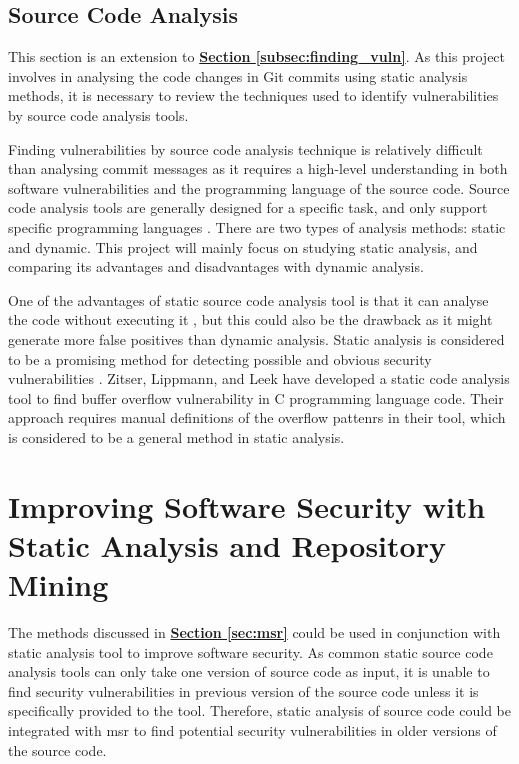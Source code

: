 \documentclass[12pt, a4paper]{report}
\begin{document}
\subsection{Source Code Analysis}
This section is an extension to \hyperref[subsec:finding_vuln]{\textbf{Section
\ref*{subsec:finding_vuln}}}. As this project involves in analysing the code changes in Git commits
using static analysis methods, it is necessary to review the techniques used to identify
vulnerabilities by source code analysis tools.

Finding vulnerabilities by source code analysis technique is relatively difficult than analysing
commit messages as it requires a high-level understanding in both software vulnerabilities and the
programming language of the source code. Source code analysis tools are generally designed for a
specific task, and only support specific programming languages \cite{antunes_2009}. There are two
types of analysis methods: static and dynamic. This project will mainly focus on studying static
analysis, and comparing its advantages and disadvantages with dynamic analysis.

One of the advantages of static source code analysis tool is that it can analyse the code without
executing it \cite{livshits_finding_2005}, but this could also be the drawback as it might generate
more false positives than dynamic analysis. Static analysis is considered to be a promising method
for detecting possible and obvious security vulnerabilities \cite{evans_2002}. Zitser, Lippmann, and
Leek \cite{zitser_2004} have developed a static code analysis tool to find buffer overflow
vulnerability in C programming language code. Their approach requires manual definitions of the
overflow pattenrs in their tool, which is considered to be a general method in static analysis.

\section{Improving Software Security with Static Analysis and Repository Mining}
The methods discussed in \hyperref[sec:msr]{\textbf{Section \ref*{sec:msr}}} could be used in
conjunction with static analysis tool to improve software security. As common static source code
analysis tools can only take one version of source code as input, it is unable to find security
vulnerabilities in previous version of the source code unless it is specifically provided to the
tool. Therefore, static analysis of source code could be integrated with \acrfull{msr} to find
potential security vulnerabilities in older versions of the source code.
\end{document}
